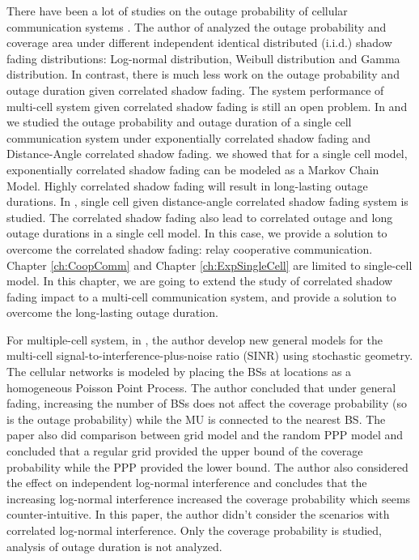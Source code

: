 \par There have been a lot of studies on the outage probability of cellular communication systems \cite{abu1991outage, petrovic2013outage, emamian2014outage}. The author of \cite{vural2015effect} analyzed the outage probability and coverage area under different independent identical distributed (i.i.d.) shadow fading distributions: Log-normal distribution, Weibull distribution and Gamma distribution. In contrast, there is much less work on the outage probability and outage duration given correlated shadow fading. The system performance of multi-cell system given correlated shadow fading is still an open problem. In \cite{lu2015long} and \cite{lu2015shining} we studied the outage probability and outage duration of a single cell communication system under exponentially correlated shadow fading and Distance-Angle correlated shadow fading. \cite{lu2015long} we showed that for a single cell model, exponentially correlated shadow fading can be modeled as a Markov Chain Model. Highly correlated shadow fading will result in long-lasting outage durations. In \cite{lu2015shining}, single cell given distance-angle correlated shadow fading system is studied. The correlated shadow fading also lead to correlated outage and long outage durations in a single cell model. In this case, we provide a solution to overcome the correlated shadow fading: relay cooperative communication. Chapter \ref{ch:CoopComm} and Chapter \ref{ch:ExpSingleCell} are limited to single-cell model. In this chapter, we are going to extend the study of correlated shadow fading impact to a multi-cell communication system, and provide a solution to overcome the long-lasting outage duration.
\par For multiple-cell system, in \cite{andrews2011tractable}, the author develop new general models for the multi-cell signal-to-interference-plus-noise ratio (SINR) using stochastic geometry. The cellular networks is modeled by placing the BSs at locations as a homogeneous Poisson Point Process. The author concluded that under general fading, increasing the number of BSs does not affect the coverage probability (so is the outage probability) while the MU is connected to the nearest BS. The paper also did comparison between grid model and the random PPP model and concluded that a regular grid provided the upper bound of the coverage probability while the PPP provided the lower bound. The author also considered the effect on independent log-normal interference and concludes that the increasing log-normal interference increased the coverage probability which seems counter-intuitive. In this paper, the author didn't consider the scenarios with correlated log-normal interference. Only the coverage probability is studied, analysis of outage duration is not analyzed. 
